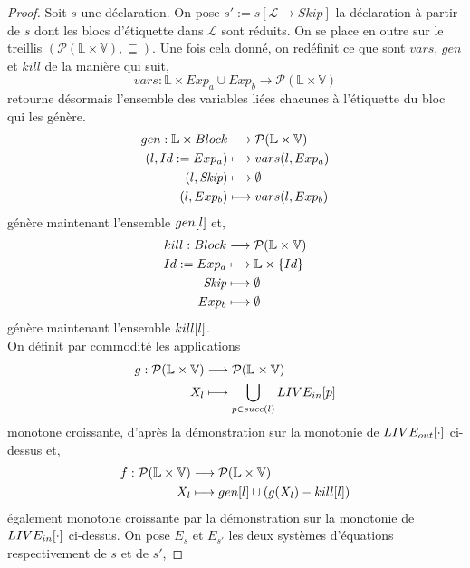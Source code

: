 \documentclass[a4paper, 12pt]{article}
\begin{document}
\begin{proof}
	Soit $s$ une déclaration. On pose $s' := s[\mathcal{L} \longmapsto Skip]$ la déclaration à partir de $s$ dont les blocs d'étiquette dans $\mathcal{L}$ sont réduits. 
	On se place en outre sur le treillis $(\mathcal{P}(\mathbb{L} \times \mathbb{V}), \sqsubseteq)$. 
	Une fois cela donné, on redéfinit ce que sont $vars$, $gen$ et $kill$ de la manière qui suit, 
	\[vars : \mathbb{L} \times Exp_a \cup Exp_b \longrightarrow \mathcal{P}(\mathbb{L} \times \mathbb{V})\]
	retourne désormais l'ensemble des variables liées chacunes à l'étiquette du bloc qui les génère.
	\begin{align*}
		gen : \mathbb{L} \times Block &\longrightarrow \mathcal{P}(\mathbb{L} \times \mathbb{V})\\
		(l, {Id}\space:=\space{Exp_a}) &\longmapsto vars(l, Exp_a)\\
		(l, \textit{Skip}) &\longmapsto \emptyset\\
		(l, Exp_b) &\longmapsto vars(l, Exp_b)
	\end{align*}
	génère maintenant l'ensemble $gen[l]$ et,
	\begin{align*}
		kill : Block &\longrightarrow \mathcal{P}(\mathbb{L} \times \mathbb{V})\\
		{Id}\space:=\space{Exp_a} &\longmapsto \mathbb{L} \times \{Id\}\\
		\textit{Skip} &\longmapsto \emptyset\\
		Exp_b &\longmapsto \emptyset
	\end{align*}
	génère maintenant l'ensemble $kill[l]$.
	\\ 
	On définit par commodité les applications
	\begin{align*}
		g : \mathcal{P}(\mathbb{L} \times \mathbb{V}) &\longrightarrow \mathcal{P}(\mathbb{L} \times \mathbb{V})\\
		X_l &\longmapsto \bigcup\limits_{p\in succ(l)} LIVE_{in}[p]
	\end{align*}
	monotone croissante, d'après la démonstration sur la monotonie de $LIVE_{out}[\cdot]$ ci-dessus et,
	\begin{align*}
		f : \mathcal{P}(\mathbb{L} \times \mathbb{V}) &\longrightarrow \mathcal{P}(\mathbb{L} \times \mathbb{V})\\
		X_l &\longmapsto gen[l] \cup (g(X_l) - kill[l])
	\end{align*}
	également monotone croissante par la démonstration sur la monotonie de $LIVE_{in}[\cdot]$ ci-dessus.
	On pose $E_s$ et $E_{s'}$ les deux systèmes d'équations respectivement de $s$ et de $s'$,

\end{proof}
\end{document}
